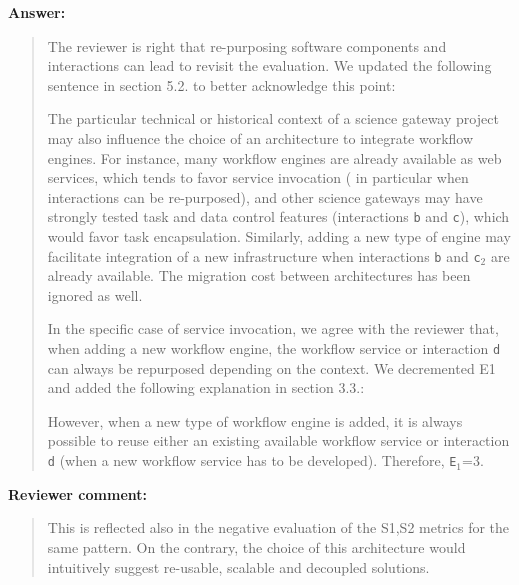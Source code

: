\documentclass[a4]{article}
\newenvironment{review}%
{\textbf{Reviewer comment:}\begin{quote}}%
{\end{quote}}%
\newenvironment{answer}%
{\textbf{Answer:}\begin{small}\begin{quote}}%
{\end{quote}\end{small}}%
\newcommand{\revised}[1]{\color{blue} #1\color{black}}
\begin{document}
\begin{answer}

The reviewer is right that re-purposing software components
  and interactions can lead to revisit the evaluation. We updated the following sentence in section 5.2. to better acknowledge this point:

The particular technical or historical context of a science gateway
project may also influence the choice of an architecture to
integrate workflow engines. For instance, many workflow engines are
already available as web services, which tends to favor service
invocation (\revised{in particular when interactions can be re-purposed}), and other science gateways may have strongly tested task
and data control features (interactions \texttt{b} and \texttt{c}),
which would favor task encapsulation. Similarly, adding a new type of engine
may facilitate integration of a new infrastructure when interactions
\texttt{b} and \texttt{c$_2$} are already available. The migration
cost between architectures has been ignored as well.

In the specific case of service invocation, we agree with the reviewer
that, when adding a new workflow engine, the workflow service or interaction \texttt{d} can always be repurposed depending on the context. We decremented E1 and added the following explanation in section 3.3.:

\revised{However, when a new type of workflow engine is added, it is always possible to reuse either an existing available workflow service or interaction \texttt{d} (when a new workflow service has to be developed). Therefore, \texttt{E$_1$}=3}.
\end{answer}

\begin{review}
 This is reflected also in the negative evaluation of the S1,S2 metrics for the same pattern. On the contrary, the choice of this architecture would intuitively suggest re-usable, scalable and decoupled solutions.
\end{review}
\end{document}
